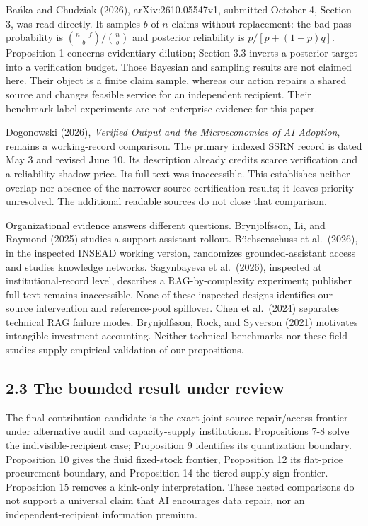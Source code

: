 \documentclass[
  11pt,
  a4paper,
]{article}
\begin{document}
Bańka and Chudziak (2026), arXiv:2610.05547v1, submitted October 4,
Section 3, was read directly. It samples \(b\) of \(n\) claims without
replacement: the bad-pass probability is \(\binom{n-f}{b}/\binom{n}{b}\)
and posterior reliability is \(p/[p+(1-p)q]\). Proposition 1 concerns
evidentiary dilution; Section 3.3 inverts a posterior target into a
verification budget. Those Bayesian and sampling results are not claimed
here. Their object is a finite claim sample, whereas our action repairs
a shared source and changes feasible service for an independent
recipient. Their benchmark-label experiments are not enterprise evidence
for this paper.

Dogonowski (2026), \emph{Verified Output and the Microeconomics of AI
Adoption}, remains a working-record comparison. The primary indexed SSRN
record is dated May 3 and revised June 10. Its description already
credits scarce verification and a reliability shadow price. Its full
text was inaccessible. This establishes neither overlap nor absence of
the narrower source-certification results; it leaves priority
unresolved. The additional readable sources do not close that
comparison.

Organizational evidence answers different questions. Brynjolfsson, Li,
and Raymond (2025) studies a support-assistant rollout. Büchsenschuss et
al.~(2026), in the inspected INSEAD working version, randomizes
grounded-assistant access and studies knowledge networks. Sagynbayeva et
al.~(2026), inspected at institutional-record level, describes a
RAG-by-complexity experiment; publisher full text remains inaccessible.
None of these inspected designs identifies our source intervention and
reference-pool spillover. Chen et al.~(2024) separates technical RAG
failure modes. Brynjolfsson, Rock, and Syverson (2021) motivates
intangible-investment accounting. Neither technical benchmarks nor these
field studies supply empirical validation of our propositions.

\hypertarget{the-bounded-result-under-review}{%
\subsection{2.3 The bounded result under
review}\label{the-bounded-result-under-review}}

The final contribution candidate is the exact joint source-repair/access
frontier under alternative audit and capacity-supply institutions.
Propositions 7-8 solve the indivisible-recipient case; Proposition 9
identifies its quantization boundary. Proposition 10 gives the fluid
fixed-stock frontier, Proposition 12 its flat-price procurement
boundary, and Proposition 14 the tiered-supply sign frontier.
Proposition 15 removes a kink-only interpretation. These nested
comparisons do not support a universal claim that AI encourages data
repair, nor an independent-recipient information premium.
\end{document}
